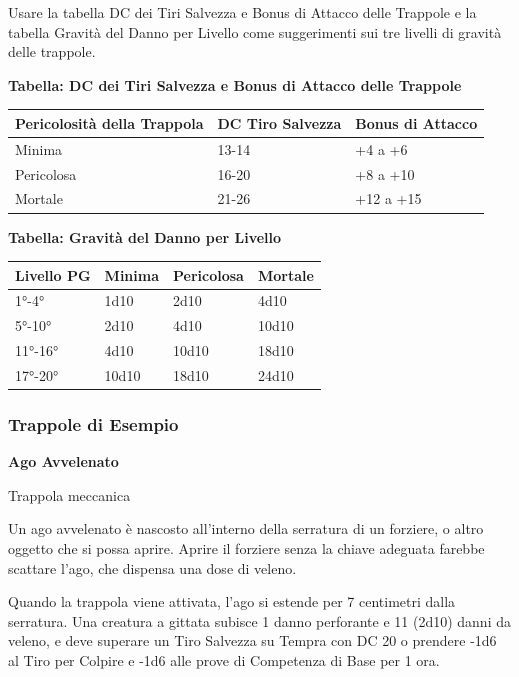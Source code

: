 \begin{multicols}{2}
Usare la tabella DC dei Tiri Salvezza e Bonus di Attacco delle Trappole e la tabella Gravità del Danno per Livello come suggerimenti sui tre livelli di gravità delle trappole.

\medskip

\textbf{Tabella: DC dei Tiri Salvezza e Bonus di Attacco delle Trappole}

\medskip

\noindent\begin{tabularx}{0.48\textwidth}{X|X|X}
Pericolosità della Trappola&DC Tiro Salvezza& Bonus di Attacco\\
\toprule
Minima&13-14&+4 a +6\\
Pericolosa&16-20&+8 a +10\\
Mortale&21-26&+12 a +15
\end{tabularx}

\medskip

\textbf{Tabella: Gravità del Danno per Livello}

\medskip

\noindent\begin{tabularx}{0.48\textwidth}{X|X|X|X}
Livello PG&Minima&Pericolosa&Mortale\\
\toprule
1°-4°&1d10&2d10&4d10\\
5°-10°&2d10&4d10&10d10\\
11°-16°&4d10&10d10&18d10\\
17°-20°&10d10&18d10&24d10
\end{tabularx}

\medskip

\subsubsection{Trappole di Esempio}\hypertarget{trappoleesempio}{}\label{trappoleesempio}
\textbf{Ago Avvelenato}

Trappola meccanica

Un ago avvelenato è nascosto all'interno della serratura di un forziere, o altro oggetto che si possa aprire. Aprire il forziere senza la chiave adeguata farebbe scattare l'ago, che dispensa una dose di veleno.

Quando la trappola viene attivata, l'ago si estende per 7 centimetri dalla serratura. Una creatura a gittata subisce 1 danno perforante e 11 (2d10) danni da veleno, e deve superare un Tiro Salvezza su Tempra con DC 20 o prendere -1d6 al Tiro per Colpire e -1d6 alle prove di Competenza di Base per 1 ora.


\end{multicols}

